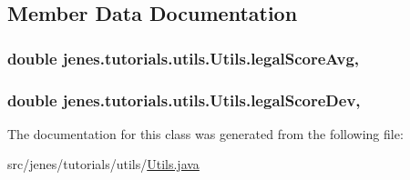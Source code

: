 \subsection{Member Data Documentation}
\hypertarget{classjenes_1_1tutorials_1_1utils_1_1_utils_af0307ceaa2b9ca93fb3cfef7c75303a8}{
\subsubsection[{legal\-Score\-Avg}]{\setlength{\rightskip}{0pt plus 5cm}double jenes.\-tutorials.\-utils.\-Utils.\-legal\-Score\-Avg\hspace{0.3cm}{\ttfamily [static]}, {\ttfamily [private]}}}\label{classjenes_1_1tutorials_1_1utils_1_1_utils_af0307ceaa2b9ca93fb3cfef7c75303a8}
\hypertarget{classjenes_1_1tutorials_1_1utils_1_1_utils_a88c455de5941ab784dee9bef8ee4d46f}{
\subsubsection[{legal\-Score\-Dev}]{\setlength{\rightskip}{0pt plus 5cm}double jenes.\-tutorials.\-utils.\-Utils.\-legal\-Score\-Dev\hspace{0.3cm}{\ttfamily [static]}, {\ttfamily [private]}}}\label{classjenes_1_1tutorials_1_1utils_1_1_utils_a88c455de5941ab784dee9bef8ee4d46f}


The documentation for this class was generated from the following file\-:\begin{DoxyCompactItemize}
\item 
src/jenes/tutorials/utils/\hyperlink{_utils_8java}{Utils.\-java}\end{DoxyCompactItemize}
